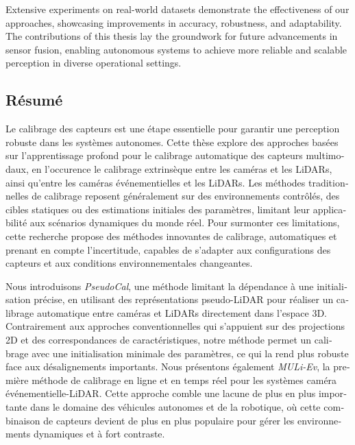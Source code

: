 Extensive experiments on real-world datasets demonstrate the effectiveness of
our approaches, showcasing improvements in accuracy, robustness, and
adaptability. The contributions of this thesis lay the groundwork for future
advancements in sensor fusion, enabling autonomous systems to achieve more
reliable and scalable perception in diverse operational settings.

\newpage
\begin{otherlanguage}{french}
  \chapter*{Résumé}

  Le calibrage des capteurs est une étape essentielle pour garantir une
  perception robuste dans les systèmes autonomes. Cette thèse explore des
  approches basées sur l'apprentissage profond pour le calibrage automatique des
  capteurs multimodaux, en l'occurence le calibrage extrinsèque entre les caméras
  et les LiDARs, ainsi qu’entre les caméras événementielles et les LiDARs. Les
  méthodes traditionnelles de calibrage reposent généralement sur des
  environnements contrôlés, des cibles statiques ou des estimations initiales des
  paramètres, limitant leur applicabilité aux scénarios dynamiques du monde réel.
  Pour surmonter ces limitations, cette recherche propose des méthodes innovantes
  de calibrage, automatiques et prenant en compte l'incertitude, capables de
  s’adapter aux configurations des capteurs et aux conditions environnementales
  changeantes.

  Nous introduisons \textit{PseudoCal}, une méthode limitant la dépendance à une
  initialisation précise, en utilisant des représentations pseudo-LiDAR pour
  réaliser un calibrage automatique entre caméras et LiDARs directement dans
  l’espace 3D. Contrairement aux approches conventionnelles qui s’appuient sur
  des projections 2D et des correspondances de caractéristiques, notre méthode
  permet un calibrage avec une initialisation minimale des paramètres, ce qui la
  rend plus robuste face aux désalignements importants. Nous présentons également
  \textit{MULi-Ev}, la première méthode de calibrage en ligne et en temps réel
  pour les systèmes caméra événementielle-LiDAR. Cette approche comble une lacune
  de plus en plus importante dans le domaine des véhicules autonomes et de la
  robotique, où cette combinaison de capteurs devient de plus en plus populaire
  pour gérer les environnements dynamiques et à fort contraste.


\end{otherlanguage}
